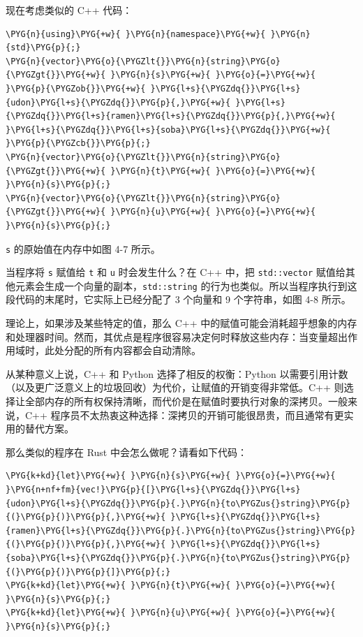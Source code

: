 现在考虑类似的 C++ 代码：

\begin{Verbatim}[commandchars=\\\{\},breaklines=true,breakanywhere=true,fontsize=\codefont,xleftmargin=17bp]
\PYG{n}{using}\PYG{+w}{ }\PYG{n}{namespace}\PYG{+w}{ }\PYG{n}{std}\PYG{p}{;}
\PYG{n}{vector}\PYG{o}{\PYGZlt{}}\PYG{n}{string}\PYG{o}{\PYGZgt{}}\PYG{+w}{ }\PYG{n}{s}\PYG{+w}{ }\PYG{o}{=}\PYG{+w}{ }\PYG{p}{\PYGZob{}}\PYG{+w}{ }\PYG{l+s}{\PYGZdq{}}\PYG{l+s}{udon}\PYG{l+s}{\PYGZdq{}}\PYG{p}{,}\PYG{+w}{ }\PYG{l+s}{\PYGZdq{}}\PYG{l+s}{ramen}\PYG{l+s}{\PYGZdq{}}\PYG{p}{,}\PYG{+w}{ }\PYG{l+s}{\PYGZdq{}}\PYG{l+s}{soba}\PYG{l+s}{\PYGZdq{}}\PYG{+w}{ }\PYG{p}{\PYGZcb{}}\PYG{p}{;}
\PYG{n}{vector}\PYG{o}{\PYGZlt{}}\PYG{n}{string}\PYG{o}{\PYGZgt{}}\PYG{+w}{ }\PYG{n}{t}\PYG{+w}{ }\PYG{o}{=}\PYG{+w}{ }\PYG{n}{s}\PYG{p}{;}
\PYG{n}{vector}\PYG{o}{\PYGZlt{}}\PYG{n}{string}\PYG{o}{\PYGZgt{}}\PYG{+w}{ }\PYG{n}{u}\PYG{+w}{ }\PYG{o}{=}\PYG{+w}{ }\PYG{n}{s}\PYG{p}{;}
\end{Verbatim}

\texttt{s} 的原始值在内存中如图 4-7 所示。


当程序将 \texttt{s} 赋值给 \texttt{t} 和 \texttt{u} 时会发生什么？在 C++ 中，把 \texttt{std::vector} 赋值给其他元素会生成一个向量的副本，\texttt{std::string} 的行为也类似。所以当程序执行到这段代码的末尾时，它实际上已经分配了 3 个向量和 9 个字符串，如图 4-8 所示。


理论上，如果涉及某些特定的值，那么 C++ 中的赋值可能会消耗超乎想象的内存和处理器时间。然而，其优点是程序很容易决定何时释放这些内存：当变量超出作用域时，此处分配的所有内容都会自动清除。

从某种意义上说，C++ 和 Python 选择了相反的权衡：Python 以需要引用计数（以及更广泛意义上的垃圾回收）为代价，让赋值的开销变得非常低。C++ 则选择让全部内存的所有权保持清晰，而代价是在赋值时要执行对象的深拷贝。一般来说，C++ 程序员不太热衷这种选择：深拷贝的开销可能很昂贵，而且通常有更实用的替代方案。

那么类似的程序在 Rust 中会怎么做呢？请看如下代码：

\begin{Verbatim}[commandchars=\\\{\},breaklines=true,breakanywhere=true,fontsize=\codefont,xleftmargin=17bp]
\PYG{k+kd}{let}\PYG{+w}{ }\PYG{n}{s}\PYG{+w}{ }\PYG{o}{=}\PYG{+w}{ }\PYG{n+nf+fm}{vec!}\PYG{p}{[}\PYG{l+s}{\PYGZdq{}}\PYG{l+s}{udon}\PYG{l+s}{\PYGZdq{}}\PYG{p}{.}\PYG{n}{to\PYGZus{}string}\PYG{p}{(}\PYG{p}{)}\PYG{p}{,}\PYG{+w}{ }\PYG{l+s}{\PYGZdq{}}\PYG{l+s}{ramen}\PYG{l+s}{\PYGZdq{}}\PYG{p}{.}\PYG{n}{to\PYGZus{}string}\PYG{p}{(}\PYG{p}{)}\PYG{p}{,}\PYG{+w}{ }\PYG{l+s}{\PYGZdq{}}\PYG{l+s}{soba}\PYG{l+s}{\PYGZdq{}}\PYG{p}{.}\PYG{n}{to\PYGZus{}string}\PYG{p}{(}\PYG{p}{)}\PYG{p}{]}\PYG{p}{;}
\PYG{k+kd}{let}\PYG{+w}{ }\PYG{n}{t}\PYG{+w}{ }\PYG{o}{=}\PYG{+w}{ }\PYG{n}{s}\PYG{p}{;}
\PYG{k+kd}{let}\PYG{+w}{ }\PYG{n}{u}\PYG{+w}{ }\PYG{o}{=}\PYG{+w}{ }\PYG{n}{s}\PYG{p}{;}
\end{Verbatim}

